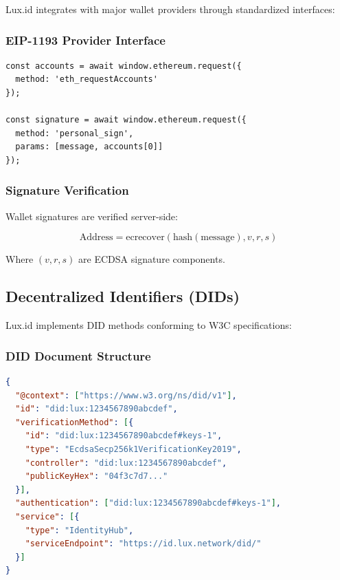 \documentclass[11pt,a4paper]{article}
\begin{document}
Lux.id integrates with major wallet providers through standardized interfaces:

\subsubsection{EIP-1193 Provider Interface}

\begin{lstlisting}[language=Solidity]
const accounts = await window.ethereum.request({
  method: 'eth_requestAccounts'
});

const signature = await window.ethereum.request({
  method: 'personal_sign',
  params: [message, accounts[0]]
});
\end{lstlisting}

\subsubsection{Signature Verification}

Wallet signatures are verified server-side:

\begin{equation}
    \text{Address} = \text{ecrecover}(\text{hash}(\text{message}), v, r, s)
\end{equation}

Where $(v, r, s)$ are ECDSA signature components.

\subsection{Decentralized Identifiers (DIDs)}

Lux.id implements DID methods conforming to W3C specifications:

\subsubsection{DID Document Structure}

\begin{lstlisting}[language=json]
{
  "@context": ["https://www.w3.org/ns/did/v1"],
  "id": "did:lux:1234567890abcdef",
  "verificationMethod": [{
    "id": "did:lux:1234567890abcdef#keys-1",
    "type": "EcdsaSecp256k1VerificationKey2019",
    "controller": "did:lux:1234567890abcdef",
    "publicKeyHex": "04f3c7d7..."
  }],
  "authentication": ["did:lux:1234567890abcdef#keys-1"],
  "service": [{
    "type": "IdentityHub",
    "serviceEndpoint": "https://id.lux.network/did/"
  }]
}
\end{lstlisting}
\end{document}
